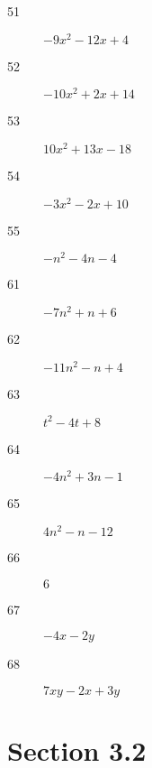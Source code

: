 \documentclass[letterpaper, landscape]{exam}
\begin{document}
\begin{description}
            \item[51] $-9x^2 -12x + 4$

            \item[52] $-10x^2 + 2x + 14$

            \item[53] $10x^2 + 13x - 18$ 

            \item[54] $-3x^2 - 2x + 10$

            \item[55] $-n^2 -4n -4$

            \item[61] $-7n^2 + n + 6$

            \item[62] $-11n^2 - n + 4$

            \item[63] $t^2 - 4t + 8$

            \item[64] $-4n^2 + 3n - 1$

            \item[65] $4n^2 - n - 12$

            \item[66] $6$

            \item[67] $-4x - 2y$

            \item[68] $7xy - 2x + 3y$

        \end{description}

        \section{Section 3.2}
\end{document}
